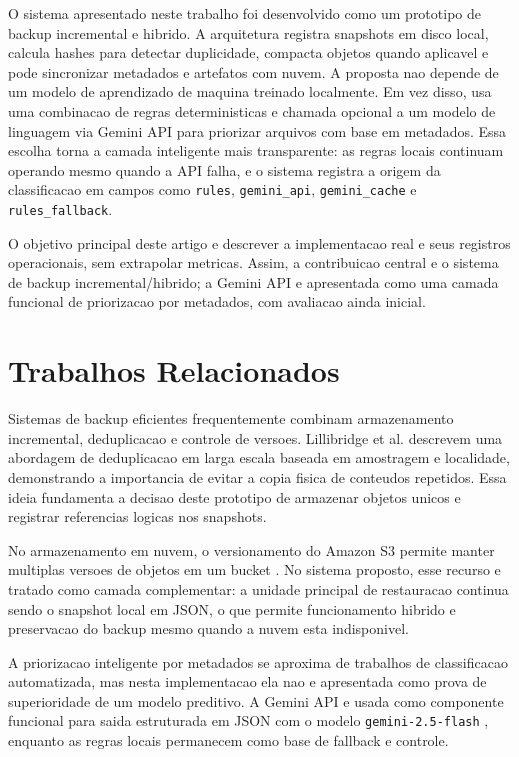 \documentclass[12pt,a4paper]{article}
\begin{document}
O sistema apresentado neste trabalho foi desenvolvido como um prototipo de backup incremental e hibrido. A arquitetura registra snapshots em disco local, calcula hashes para detectar duplicidade, compacta objetos quando aplicavel e pode sincronizar metadados e artefatos com nuvem. A proposta nao depende de um modelo de aprendizado de maquina treinado localmente. Em vez disso, usa uma combinacao de regras deterministicas e chamada opcional a um modelo de linguagem via Gemini API para priorizar arquivos com base em metadados. Essa escolha torna a camada inteligente mais transparente: as regras locais continuam operando mesmo quando a API falha, e o sistema registra a origem da classificacao em campos como \texttt{rules}, \texttt{gemini\_api}, \texttt{gemini\_cache} e \texttt{rules\_fallback}.

O objetivo principal deste artigo e descrever a implementacao real e seus registros operacionais, sem extrapolar metricas. Assim, a contribuicao central e o sistema de backup incremental/hibrido; a Gemini API e apresentada como uma camada funcional de priorizacao por metadados, com avaliacao ainda inicial.

\section{Trabalhos Relacionados}

Sistemas de backup eficientes frequentemente combinam armazenamento incremental, deduplicacao e controle de versoes. Lillibridge et al. \cite{lillibridge2009sparse} descrevem uma abordagem de deduplicacao em larga escala baseada em amostragem e localidade, demonstrando a importancia de evitar a copia fisica de conteudos repetidos. Essa ideia fundamenta a decisao deste prototipo de armazenar objetos unicos e registrar referencias logicas nos snapshots.

No armazenamento em nuvem, o versionamento do Amazon S3 permite manter multiplas versoes de objetos em um bucket \cite{awsS3Versioning}. No sistema proposto, esse recurso e tratado como camada complementar: a unidade principal de restauracao continua sendo o snapshot local em JSON, o que permite funcionamento hibrido e preservacao do backup mesmo quando a nuvem esta indisponivel.

A priorizacao inteligente por metadados se aproxima de trabalhos de classificacao automatizada, mas nesta implementacao ela nao e apresentada como prova de superioridade de um modelo preditivo. A Gemini API e usada como componente funcional para saida estruturada em JSON \cite{googleStructuredOutput} com o modelo \texttt{gemini-2.5-flash} \cite{googleGeminiModels}, enquanto as regras locais permanecem como base de fallback e controle.
\end{document}

